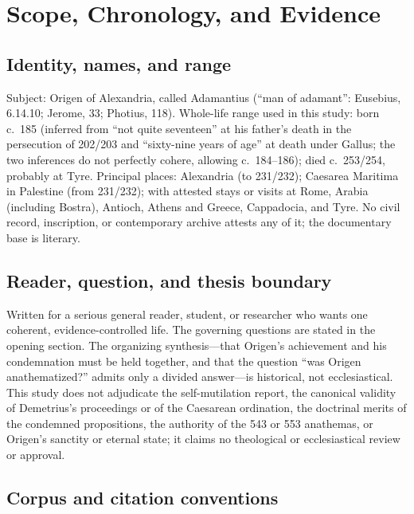 \section{Scope, Chronology, and Evidence}

\subsection{Identity, names, and range}

Subject: Origen of Alexandria, called Adamantius (``man of adamant'':
Eusebius,  6.14.10; Jerome,  33; Photius,
 118). Whole-life range used in this study: born c.~185
(inferred from ``not quite seventeen'' at his father's death in the
persecution of 202/203 and ``sixty-nine years of age'' at death under
Gallus; the two inferences do not perfectly cohere, allowing c.~184--186);
died c.~253/254, probably at Tyre. Principal places: Alexandria (to
231/232); Caesarea Maritima in Palestine (from 231/232); with attested
stays or visits at Rome, Arabia (including Bostra), Antioch, Athens and
Greece, Cappadocia, and Tyre. No civil record,
inscription, or contemporary archive attests any of it; the documentary
base is literary.

\subsection{Reader, question, and thesis boundary}

Written for a serious general reader, student, or researcher who wants one
coherent, evidence-controlled life. The governing questions are stated in
the opening section. The organizing synthesis---that Origen's achievement
and his condemnation must be held together, and that the question ``was
Origen anathematized?'' admits only a divided answer---is historical, not
ecclesiastical. This study does not adjudicate the self-mutilation report,
the canonical validity of Demetrius's proceedings or of the Caesarean
ordination, the doctrinal merits of the condemned propositions, the
authority of the 543 or 553 anathemas, or Origen's sanctity or eternal
state; it claims no theological or ecclesiastical review or approval.

\subsection{Corpus and citation conventions}

